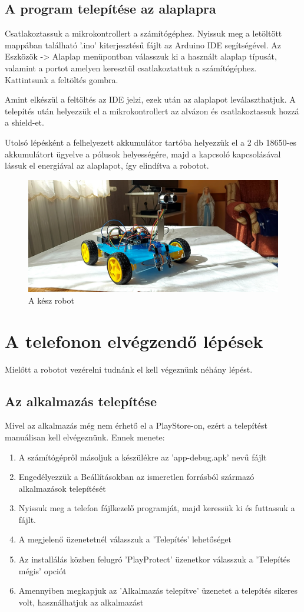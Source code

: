 \documentclass[]{thesis-ekf}
\theoremstyle{definition}
\begin{document}
\subsection{A program telepítése az alaplapra}
Csatlakoztassuk a mikrokontrollert a számítógéphez. Nyissuk meg a letöltött mappában található ’.ino’ kiterjesztésű fájlt az Arduino IDE segítségével. Az Eszközök -> Alaplap menüpontban válasszuk ki a használt alaplap típusát, valamint a portot amelyen keresztül csatlakoztattuk a számítógéphez. Kattintsunk a feltöltés gombra. 

Amint elkészül a feltöltés az IDE jelzi, ezek után az alaplapot leválaszthatjuk. A telepítés után helyezzük el a mikrokontrollert az alvázon és csatlakoztassuk hozzá a shield-et.

Utolsó lépésként a felhelyezett akkumulátor tartóba helyezzük el a 2 db 18650-es akkumulátort ügyelve a pólusok helyességére, majd a kapcsoló kapcsolásával lássuk el energiával az alaplapot, így elindítva a robotot.
\begin{figure}[h]
	\centering
	\includegraphics[width=\linewidth]{images/robot_build/finished_robot}
	\caption{A kész robot}
	\label{finished_robot}
\end{figure}
\section{A telefonon elvégzendő lépések}
Mielőtt a robotot vezérelni tudnánk el kell végeznünk néhány lépést.
\subsection{Az alkalmazás telepítése}
Mivel az alkalmazás még nem érhető el a PlayStore-on, ezért a telepítést manuálisan kell elvégeznünk. Ennek menete:
\begin{enumerate}
	\item A számítógépről másoljuk a készülékre az 'app-debug.apk' nevű fájlt
	\item Engedélyezzük a Beállításokban az ismeretlen forrásból származó alkalmazások telepítését
	\item Nyissuk meg a telefon fájlkezelő programját, majd keressük ki és futtassuk a fájlt.
	\item A megjelenő üzenetetnél válasszuk a 'Telepítés' lehetőséget
	\item Az installálás közben felugró 'PlayProtect' üzenetkor válasszuk a 'Telepítés mégis' opciót
	\item Amennyiben megkapjuk az 'Alkalmazás telepítve' üzenetet a telepítés sikeres volt, használhatjuk az alkalmazást
\end{enumerate}
\end{document}
